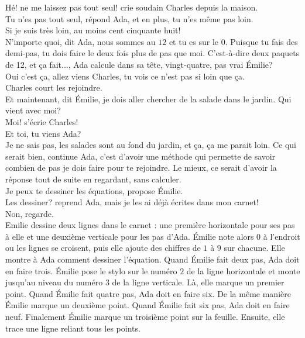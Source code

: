 \mdash Hé! ne me laissez pas tout seul! crie soudain Charles depuis la maison.\\
\mdash Tu n’es pas tout seul, répond Ada, et en plus, tu n'es même pas loin.\\
\mdash Si je suis très loin, au moins cent cinquante huit!\\
\mdash N'importe quoi, dit Ada, nous sommes au $12$ et tu es sur le $0$. Puisque tu fais des demi-pas, tu dois faire le deux fois plus de pas que moi. C'est-à-dire deux paquets de 12, et ça fait..., Ada calcule dans sa tête, vingt-quatre, pas vrai Émilie?\\
\mdash Oui c'est ça, allez viens Charles, tu vois ce n’est pas si loin que ça.\guillemotright\\
Charles court les rejoindre.\\
\guillemotleft Et maintenant, dit Émilie, je dois aller chercher de la salade dans le jardin. Qui vient avec moi?\\
\mdash Moi! s'écrie Charles!\\
\mdash Et toi, tu viens Ada?\\
\mdash Je ne sais pas, les salades sont au fond du jardin, et ça, ça me parait loin. Ce qui serait bien, continue Ada, c’est d'avoir une méthode qui permette de savoir combien de pas je dois faire pour te rejoindre. Le mieux, ce serait d'avoir la réponse tout de suite en regardant, sans calculer.\\
\mdash Je peux te dessiner les équations, propose Émilie.\\
\mdash Les dessiner? reprend Ada, mais je les ai déjà écrites dans mon carnet!\\
\mdash Non, regarde.\guillemotright\\
Emilie dessine deux lignes dans le carnet : une première horizontale pour ses pas à elle et une deuxième verticale pour les pas d’Ada. Émilie note alors $0$ à l’endroit ou les lignes se croisent, puis elle ajoute des chiffres de $1$ à $9$ sur chacune. Elle montre à Ada comment dessiner l'équation. Quand Émilie fait deux pas, Ada doit en faire trois. Émilie pose le stylo sur le numéro $2$ de la ligne horizontale et monte jusqu'au niveau du numéro $3$ de la ligne verticale. Là, elle marque un premier point. Quand Émilie fait quatre pas, Ada doit en faire six. De la même manière Émilie marque un deuxième point. Quand Émilie fait six pas, Ada doit en faire neuf. Finalement Émilie marque un troisième point sur la feuille. Ensuite, elle trace une ligne reliant tous les points.\\
